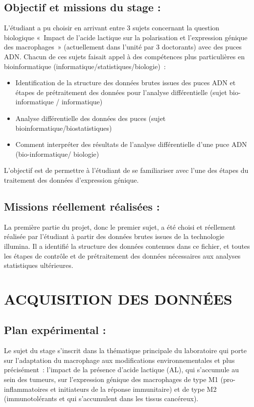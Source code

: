 \documentclass[a4paper,10pt]{article}
\begin{document}
\subsection{Objectif et missions du stage :}
L’étudiant a pu choisir en arrivant entre 3 sujets concernant la question biologique « Impact de l’acide lactique sur la polarisation et l’expression génique des macrophages » (actuellement dans l’unité par 3 doctorants)  avec des puces ADN. Chacun de ces sujets faisait appel à des compétences plus particulières en bioinformatique (informatique/statistiques/biologie) :
\begin{itemize}
 \item Identification de la structure des données brutes issues des puces ADN et étapes de prétraitement des données pour l’analyse différentielle (sujet bio-informatique / informatique)
\item Analyse différentielle des données des puces (sujet bioinformatique/biostatistiques)
\item Comment interpréter des résultats de l’analyse différentielle d’une puce ADN (bio-informatique/ biologie)
\end{itemize}
L’objectif est de permettre à l’étudiant de se familiariser avec l’une des étapes du traitement des données d’expression génique.
\subsection{Missions réellement réalisées :}
La première partie du projet, donc le premier sujet, a été choisi et réellement réalisée par l’étudiant à partir des données brutes issues de la technologie illumina. 
Il a identifié la structure des données contenues dans ce fichier, et toutes les étapes de contrôle et de prétraitement des données nécessaires aux analyses statistiques ultérieures.
\section{ACQUISITION DES DONN\'{E}ES }

\subsection{ Plan expérimental :}
Le sujet du stage s’inscrit dans la thématique principale du laboratoire qui porte sur l’adaptation du macrophage aux modifications environnementales et plus précisément : l’impact de la présence d’acide lactique (AL), qui s’accumule au sein des tumeurs, sur l’expression génique des macrophages de type M1 (pro-inflammatoires et initiateurs de la réponse immunitaire) et de type M2 (immunotolérants et qui s’accumulent dans les tissus cancéreux).
\end{document}
